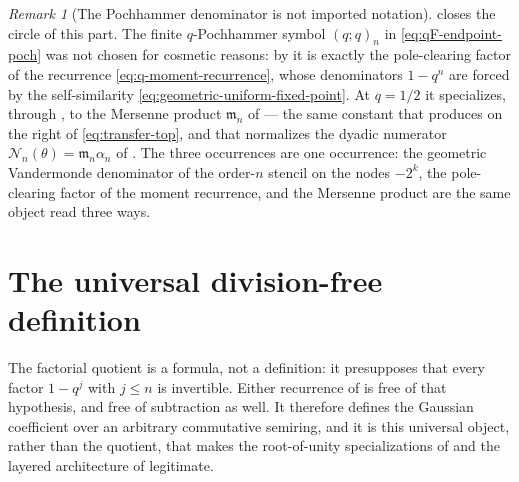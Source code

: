 \documentclass[11pt,oneside,openany]{book}
\theoremstyle{definition}
\theoremstyle{remark}
\newtheorem{remark}[remark]{Remark}
\newcommand{\poch}[3]{(#1;#2)_{#3}}
\begin{document}
\begin{remark}[The Pochhammer denominator is not imported notation]\label{rem:qF-not-imported}
 closes the circle of this part.  The finite $q$-Pochhammer
symbol $\poch qqn$ in \eqref{eq:qF-endpoint-poch} was not chosen for cosmetic reasons: by
 it is exactly the pole-clearing
factor of the recurrence \eqref{eq:q-moment-recurrence}, whose denominators $1-q^n$ are forced
by the self-similarity \eqref{eq:geometric-uniform-fixed-point}.  At $q=1/2$ it specializes,
through , to the Mersenne product $\mathfrak m_n$ of
 --- the same constant that
 produces on the right of \eqref{eq:transfer-top}, and
that normalizes the dyadic numerator $\mathcal N_n(\theta)=\mathfrak m_n\alpha_n$ of
.  The three occurrences are one occurrence: the geometric
Vandermonde denominator of the order-$n$ stencil on the nodes $-2^k$, the pole-clearing factor
of the moment recurrence, and the Mersenne product are the same object read three ways.
\end{remark}



\section{The universal division-free definition}

The factorial quotient is a formula, not a definition: it presupposes that every factor $1-q^j$ with $j\le n$ is invertible.  Either recurrence of  is free of that hypothesis, and free of subtraction as well.  It therefore defines the Gaussian coefficient over an arbitrary commutative semiring, and it is this universal object, rather than the quotient, that makes the root-of-unity specializations of  and the layered architecture of  legitimate.
\end{document}
